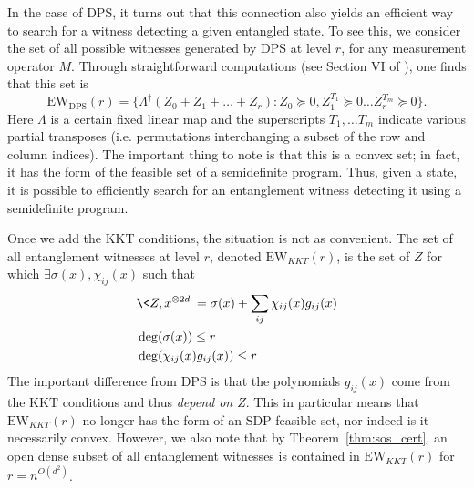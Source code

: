 \documentclass[aps,pra,notitlepage,preprintnumbers,11pt,tightenlines]{revtex4-1}
\newcommand{\ot}{\otimes}
\newcommand{\be}{\begin{equation}}
\newcommand{\ee}{\end{equation}}
\begin{document}
In the case of DPS, it turns out that this connection also yields an
efficient way to search for a witness detecting a given entangled
state. To see this, we consider the set of all possible witnesses
generated by DPS at level $r$, for any measurement operator $M$. Through straightforward computations (see Section VI of
\cite{dps:2003}), one finds that this set is
\be \label{eq:dps_witness} \mathrm{EW}_{\text{DPS}}(r) 
= \{ \Lambda^\dagger(Z_0 + Z_1 + \dots + Z_r)
: Z_0 \succeq 0, Z_1^{T_1} \succeq 0 \dots Z_r^{T_m} \succeq 0\}. \ee
Here $\Lambda$ is a certain fixed linear map and the superscripts $T_1, \dots T_m$
indicate various partial transposes (i.e. permutations interchanging a
subset of the row and column indices). The important thing to note is
that this is a convex set; in fact, it has the form of the feasible
set of a semidefinite program. Thus, given a state, it is possible to
efficiently search for an entanglement witness detecting it using a
semidefinite program.

Once we add the KKT conditions, the situation is not as
convenient. The set of all entanglement witnesses at level $r$,
denoted $\mathrm{EW}_{KKT}(r)$, is the set of $Z$ for which  $\exists
\sigma(x), \chi_{ij}(x)$ such that 
$$ \begin{aligned} &\<Z, x^{\ot 2d}\>
= \sigma(x) + \sum_{ij} \chi_{ij}(x) g_{ij}(x) \\ &\deg(\sigma(x)) \leq
r \\ &\deg(\chi_{ij}(x) g_{ij}(x)) \leq r \end{aligned}
$$
The important difference from DPS is that the polynomials $g_{ij}(x)$
come from the KKT conditions and thus \emph{depend on $Z$}. This in
particular means that $\mathrm{EW}_{KKT}(r)$ no longer has the form of
an SDP feasible set, nor indeed is it necessarily convex. However, we also note that by
Theorem~\ref{thm:sos_cert}, an open dense subset of all entanglement witnesses is contained in
$\mathrm{EW}_{KKT}(r)$ for $r = n^{O(d^2)}$.
\end{document}
